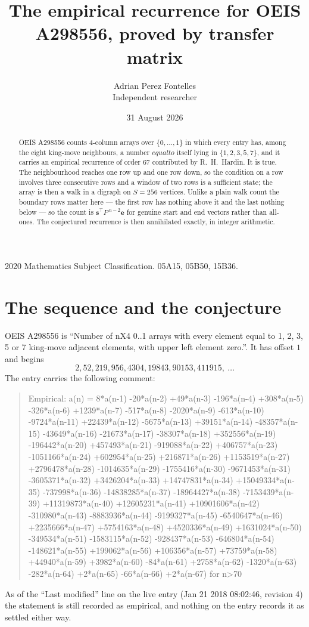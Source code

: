 \documentclass[11pt,a4paper]{article}
\title{The empirical recurrence for OEIS A298556, proved by transfer matrix}
\author{Adrian Perez Fontelles\\ \small Independent researcher}
\date{31 August 2026}
\theoremstyle{plain}
\theoremstyle{definition}
\begin{document}
\maketitle

\begin{abstract}
OEIS A298556 counts $4$-column arrays over $\{0,\dots,1\}$ in which every entry has,
among the eight king-move neighbours, a number $equal to$ itself lying in $\{1,2,3,5,7\}$, and it carries an empirical
recurrence of order $67$ contributed by R.~H.~Hardin. It is true. The neighbourhood
reaches one row up and one row down, so the condition on a row involves three consecutive
rows and a window of two rows is a sufficient state; the array is then a walk in a digraph
on $S=256$ vertices. Unlike a plain walk count the boundary rows matter here --- the first
row has nothing above it and the last nothing below --- so the count is
$\mathbf{s}^{\!\top}P^{\,n-2}\mathbf{e}$ for genuine start and end vectors rather than
all-ones. The conjectured recurrence is then annihilated exactly, in integer arithmetic.
\end{abstract}

\noindent\small 2020 Mathematics Subject Classification. 05A15, 05B50, 15B36.\normalsize

\section{The sequence and the conjecture}

OEIS A298556 is ``Number of nX4 0..1 arrays with every element equal to 1, 2, 3, 5 or 7 king-move adjacent elements, with upper left element zero.''. It has offset
$1$ and begins
\[
2, 52, 219, 956, 4304, 19843, 90153, 411915,\ \dots
\]
The entry carries the following comment:
\begin{quote}\small
Empirical: a(n) = 8*a(n-1) -20*a(n-2) +49*a(n-3) -196*a(n-4) +308*a(n-5) -326*a(n-6) +1239*a(n-7) -517*a(n-8) -2020*a(n-9) -613*a(n-10) -9724*a(n-11) +22439*a(n-12) -5675*a(n-13) +39151*a(n-14) -48357*a(n-15) -43649*a(n-16) -21673*a(n-17) -38307*a(n-18) +352556*a(n-19) -196442*a(n-20) +457493*a(n-21) -919088*a(n-22) +406757*a(n-23) -1051166*a(n-24) +602954*a(n-25) +216871*a(n-26) +1153519*a(n-27) +2796478*a(n-28) -1014635*a(n-29) -1755416*a(n-30) -9671453*a(n-31) -3605371*a(n-32) +3426204*a(n-33) +14747831*a(n-34) +15049334*a(n-35) -737998*a(n-36) -14838285*a(n-37) -18964427*a(n-38) -7153439*a(n-39) +11319873*a(n-40) +12605231*a(n-41) +10901606*a(n-42) -310980*a(n-43) -8883936*a(n-44) -9199327*a(n-45) -6540647*a(n-46) +2235666*a(n-47) +5754163*a(n-48) +4520336*a(n-49) +1631024*a(n-50) -349534*a(n-51) -1583115*a(n-52) -928437*a(n-53) -646804*a(n-54) -148621*a(n-55) +199062*a(n-56) +106356*a(n-57) +73759*a(n-58) +44940*a(n-59) +3982*a(n-60) -84*a(n-61) +2758*a(n-62) -1320*a(n-63) -282*a(n-64) +2*a(n-65) -66*a(n-66) +2*a(n-67) for n>70
\end{quote}
As of the ``Last modified'' line on the live entry (Jan 21 2018 08:02:46, revision
4) the statement is still recorded as empirical, and nothing on the entry
records it as settled either way.
\end{document}

